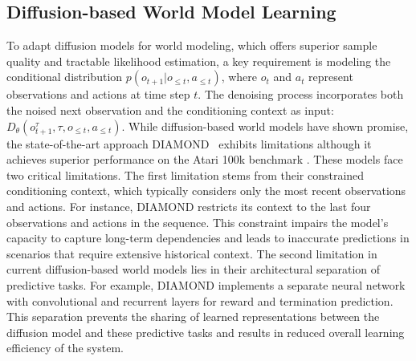 \subsection{Diffusion-based World Model Learning}
\vspace{-0.5em}
To adapt diffusion models for world modeling, which offers superior sample quality and tractable likelihood estimation, 
a key requirement is modeling the conditional distribution $p(o_{t+1}|o_{\leq t}, a_{\leq t})$, where $o_t$ and $a_t$ represent observations and actions at time step $t$. The denoising process incorporates both the noised next observation and the conditioning context as input: $D_\theta(o_{t+1}^{\tau}, \tau, o_{\leq t}, a_{\leq t})$.
%
While diffusion-based world models \cite{alonso2024diamond} have shown promise, the state-of-the-art approach DIAMOND~\cite{alonso2024diamond} exhibits limitations although it achieves superior performance on the Atari 100k benchmark \cite{Kaiser2020SimPLe}. These models face two critical limitations. The first limitation stems from their constrained conditioning context, which typically considers only the most recent observations and actions. For instance, DIAMOND restricts its context to the last four observations and actions in the sequence. This constraint impairs the model's capacity to capture long-term dependencies and leads to inaccurate predictions in scenarios that require extensive historical context. The second limitation in current diffusion-based world models lies in their architectural separation of predictive tasks. For example, DIAMOND implements a separate neural network with convolutional and recurrent layers for reward and termination prediction. This separation prevents the sharing of learned representations between the diffusion model and these predictive tasks and results in reduced overall learning efficiency of the system.